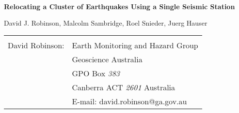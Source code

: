 \documentclass[12pt,double]{article}
\begin{document}
\begin{centering}
\LARGE{\textbf{Relocating a Cluster of Earthquakes Using a Single Seismic Station}} \\  
\end{centering}
\vspace{3em}
\begin{centering}
David J. Robinson, Malcolm Sambridge, Roel Snieder, Juerg Hauser \\
\end{centering}

\vspace{7em}
\begin{tabular}{lp{}}
 & \\
David Robinson: & Earth Monitoring and Hazard Group \\
 &  Geoscience Australia \\
 & GPO Box \emph{383} \\
 & Canberra ACT \emph{2601} Australia \\
 & E-mail: david.robinson@ga.gov.au\\
\end{tabular}

\clearpage
\label{firstpage}

\end{document}
